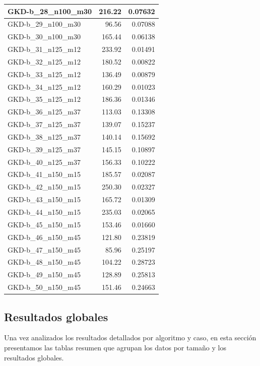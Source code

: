 \documentclass{article}
\begin{document}
\begin{table}[ht]
\begin{tabular}{|l|r|r|}
GKD-b\_28\_n100\_m30 & 216.22 & 0.07632 \\ \hline
GKD-b\_29\_n100\_m30 & 96.56 & 0.07088 \\ \hline
GKD-b\_30\_n100\_m30 & 165.44 & 0.06138 \\ \hline
GKD-b\_31\_n125\_m12 & 233.92 & 0.01491 \\ \hline
GKD-b\_32\_n125\_m12 & 180.52 & 0.00822 \\ \hline
GKD-b\_33\_n125\_m12 & 136.49 & 0.00879 \\ \hline
GKD-b\_34\_n125\_m12 & 160.29 & 0.01023 \\ \hline
GKD-b\_35\_n125\_m12 & 186.36 & 0.01346 \\ \hline
GKD-b\_36\_n125\_m37 & 113.03 & 0.13308 \\ \hline
GKD-b\_37\_n125\_m37 & 139.07 & 0.15237 \\ \hline
GKD-b\_38\_n125\_m37 & 140.14 & 0.15692 \\ \hline
GKD-b\_39\_n125\_m37 & 145.15 & 0.10897 \\ \hline
GKD-b\_40\_n125\_m37 & 156.33 & 0.10222 \\ \hline
GKD-b\_41\_n150\_m15 & 185.57 & 0.02087 \\ \hline
GKD-b\_42\_n150\_m15 & 250.30 & 0.02327 \\ \hline
GKD-b\_43\_n150\_m15 & 165.72 & 0.01309 \\ \hline
GKD-b\_44\_n150\_m15 & 235.03 & 0.02065 \\ \hline
GKD-b\_45\_n150\_m15 & 153.46 & 0.01660 \\ \hline
GKD-b\_46\_n150\_m45 & 121.80 & 0.23819 \\ \hline
GKD-b\_47\_n150\_m45 & 85.96 & 0.25197 \\ \hline
GKD-b\_48\_n150\_m45 & 104.22 & 0.28723 \\ \hline
GKD-b\_49\_n150\_m45 & 128.89 & 0.25813 \\ \hline
GKD-b\_50\_n150\_m45 & 151.46 & 0.24663 \\ \hline
\end{tabular}
\end{table}

\newpage
\subsection{Resultados globales}

Una vez analizados los resultados detallados por algoritmo y caso, en esta sección presentamos las tablas resumen que agrupan los datos por tamaño y los resultados globales.
\end{document}
